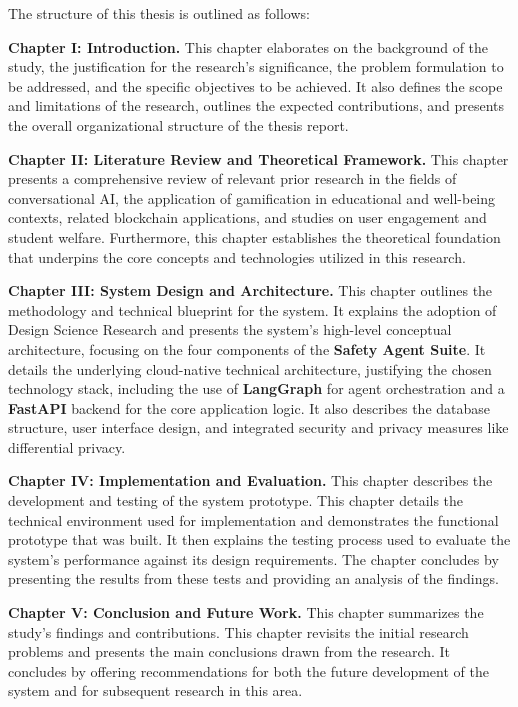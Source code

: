 The structure of this thesis is outlined as follows:

\textbf{Chapter I: Introduction.} This chapter elaborates on the background of the study, the justification for the research's significance, the problem formulation to be addressed, and the specific objectives to be achieved. It also defines the scope and limitations of the research, outlines the expected contributions, and presents the overall organizational structure of the thesis report.

\textbf{Chapter II: Literature Review and Theoretical Framework.} This chapter presents a comprehensive review of relevant prior research in the fields of conversational AI, the application of gamification in educational and well-being contexts, related blockchain applications, and studies on user engagement and student welfare. Furthermore, this chapter establishes the theoretical foundation that underpins the core concepts and technologies utilized in this research.

\textbf{Chapter III: System Design and Architecture.} This chapter outlines the methodology and technical blueprint for the system. It explains the adoption of Design Science Research and presents the system's high-level conceptual architecture, focusing on the four components of the \textbf{Safety Agent Suite}. It details the underlying cloud-native technical architecture, justifying the chosen technology stack, including the use of \textbf{LangGraph} for agent orchestration and a \textbf{FastAPI} backend for the core application logic. It also describes the database structure, user interface design, and integrated security and privacy measures like differential privacy.

\textbf{Chapter IV: Implementation and Evaluation.} This chapter describes the development and testing of the system prototype. This chapter details the technical environment used for implementation and demonstrates the functional prototype that was built. It then explains the testing process used to evaluate the system's performance against its design requirements. The chapter concludes by presenting the results from these tests and providing an analysis of the findings.

\textbf{Chapter V: Conclusion and Future Work.} This chapter summarizes the study's findings and contributions. This chapter revisits the initial research problems and presents the main conclusions drawn from the research. It concludes by offering recommendations for both the future development of the system and for subsequent research in this area.

